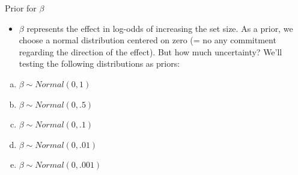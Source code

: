 \documentclass[12pt,ignorenonframetext,aspectratio=169]{beamer}
\providecommand{\tightlist}{%
  \setlength{\itemsep}{0pt}\setlength{\parskip}{0pt}}
\begin{document}
\begin{frame}{Prior for \(\beta\)}
\protect\hypertarget{prior-for-beta-2}{}

\begin{itemize}
\tightlist
\item
  \(\beta\) represents the effect in log-odds of increasing the set size. As a prior, we choose a normal distribution centered on zero (= no any commitment regarding the direction of the effect). But how much uncertainty? We'll testing the following distributions as priors:
\end{itemize}

\begin{enumerate}
[(a)]
\tightlist
\item
  \(\beta \sim Normal(0, 1)\)
\item
  \(\beta \sim Normal(0, .5)\)
\item
  \(\beta \sim Normal(0, .1)\)
\item
  \(\beta \sim Normal(0, .01)\)
\item
  \(\beta \sim Normal(0, .001)\)
\end{enumerate}

\end{frame}
\end{document}
